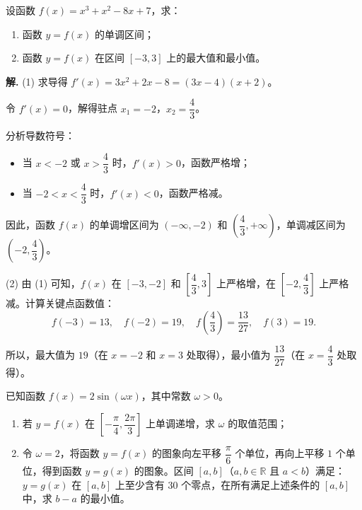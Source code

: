 \documentclass[11pt]{ctexrep}
\begin{document}
\begin{example}[利用导数求单调区间]
    设函数 $f(x) = x^3 + x^2 - 8x + 7$，求：
    \begin{enumerate}
        \item 函数 $y = f(x)$ 的单调区间；
        \item 函数 $y = f(x)$ 在区间 $[-3, 3]$ 上的最大值和最小值。
    \end{enumerate}
\end{example}

\textbf{解.} (1) 求导得 $f'(x) = 3x^2 + 2x - 8 = (3x - 4)(x + 2)$。

令 $f'(x) = 0$，解得驻点 $x_1 = -2$，$x_2 = \dfrac{4}{3}$。

分析导数符号：
\begin{itemize}
    \item 当 $x < -2$ 或 $x > \dfrac{4}{3}$ 时，$f'(x) > 0$，函数严格增；
    \item 当 $-2 < x < \dfrac{4}{3}$ 时，$f'(x) < 0$，函数严格减。
\end{itemize}

因此，函数 $f(x)$ 的单调增区间为 $(-\infty, -2)$ 和 $\left( \dfrac{4}{3}, +\infty \right)$，单调减区间为 $\left( -2, \dfrac{4}{3} \right)$。

(2) 由 (1) 可知，$f(x)$ 在 $[-3, -2]$ 和 $\left[ \dfrac{4}{3}, 3 \right]$ 上严格增，在 $\left[ -2, \dfrac{4}{3} \right]$ 上严格减。计算关键点函数值：
\[
    f(-3) = 13, \quad f(-2) = 19, \quad f\left( \frac{4}{3} \right) = \frac{13}{27}, \quad f(3) = 19.
\]

所以，最大值为 $19$（在 $x = -2$ 和 $x = 3$ 处取得），最小值为 $\dfrac{13}{27}$（在 $x = \dfrac{4}{3}$ 处取得）。

\begin{realexam}[2013 上海秋考]
    已知函数 $f(x) = 2\sin(\omega x)$，其中常数 $\omega > 0$。
    \begin{enumerate}
        \item 若 $y = f(x)$ 在 $\left[ -\dfrac{\pi}{4}, \dfrac{2\pi}{3} \right]$ 上单调递增，求 $\omega$ 的取值范围；
        \item 令 $\omega = 2$，将函数 $y = f(x)$ 的图象向左平移 $\dfrac{\pi}{6}$ 个单位，再向上平移 $1$ 个单位，得到函数 $y = g(x)$ 的图象。区间 $[a, b]$（$a, b \in \mathbb{R}$ 且 $a < b$）满足：$y = g(x)$ 在 $[a, b]$ 上至少含有 $30$ 个零点，在所有满足上述条件的 $[a, b]$ 中，求 $b - a$ 的最小值。
    \end{enumerate}
\end{realexam}
\end{document}
